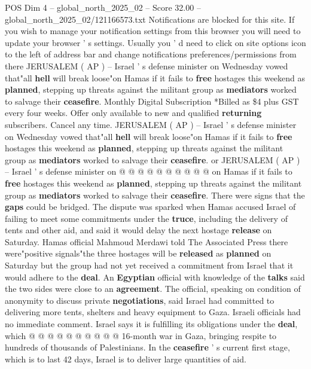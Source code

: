 \begin{textsample}{POS Dim 4 – global\_north\_2025\_02 – Score 32.00 – global\_north\_2025\_02/121166573.txt}  \label{ex:f4_pos_056}
Notifications are blocked for this site.
If you wish to manage your notification settings from this browser you will need to update your browser ' s settings.
Usually you ' d need to click on site options icon to the left of address bar and change notifications preferences/permissions from there JERUSALEM ( AP ) -- Israel ' s defense minister on Wednesday vowed that"all \textbf{hell} will break loose"on Hamas if it fails to \textbf{free} hostages this weekend as \textbf{planned}, stepping up threats against the militant group as \textbf{mediators} worked to salvage their \textbf{ceasefire}.
Monthly Digital Subscription *Billed as \$4 plus GST every four weeks.
Offer only available to new and qualified \textbf{returning} subscribers.
Cancel any time.
JERUSALEM ( AP ) -- Israel ' s defense minister on Wednesday vowed that"all \textbf{hell} will break loose"on Hamas if it fails to \textbf{free} hostages this weekend as \textbf{planned}, stepping up threats against the militant group as \textbf{mediators} worked to salvage their \textbf{ceasefire}. or JERUSALEM ( AP ) -- Israel ' s defense minister on @ @ @ @ @ @ @ @ @ @ on Hamas if it fails to \textbf{free} hostages this weekend as \textbf{planned}, stepping up threats against the militant group as \textbf{mediators} worked to salvage their \textbf{ceasefire}.
There were signs that the \textbf{gaps} could be bridged.
The dispute was sparked when Hamas accused Israel of failing to meet some commitments under the \textbf{truce}, including the delivery of tents and other aid, and said it would delay the next hostage \textbf{release} on Saturday.
Hamas official Mahmoud Merdawi told The Associated Press there were"positive signals"the three hostages will be \textbf{released} as \textbf{planned} on Saturday but the group had not yet received a commitment from Israel that it would adhere to the \textbf{deal}.
An \textbf{Egyptian} official with knowledge of the \textbf{talks} said the two sides were close to an \textbf{agreement}.
The official, speaking on condition of anonymity to discuss private \textbf{negotiations}, said Israel had committed to delivering more tents, shelters and heavy equipment to Gaza.
Israeli officials had no immediate comment.
Israel says it is fulfilling its obligations under the \textbf{deal}, which @ @ @ @ @ @ @ @ @ @ 16-month war in Gaza, bringing respite to hundreds of thousands of Palestinians.
In the \textbf{ceasefire} ' s current first stage, which is to last 42 days, Israel is to deliver large quantities of aid.

\end{textsample}
